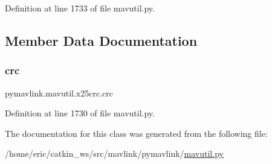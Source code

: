 Definition at line 1733 of file mavutil.\+py.



\subsection{Member Data Documentation}
\mbox{\label{classpymavlink_1_1mavutil_1_1x25crc_a89ee93fb5da26919551f8765f70f476c}} 
\subsubsection{\texorpdfstring{crc}{crc}}
{\footnotesize\ttfamily pymavlink.\+mavutil.\+x25crc.\+crc}



Definition at line 1730 of file mavutil.\+py.



The documentation for this class was generated from the following file\+:\begin{DoxyCompactItemize}
\item 
/home/eric/catkin\+\_\+ws/src/mavlink/pymavlink/\mbox{\hyperlink{mavutil_8py}{mavutil.\+py}}\end{DoxyCompactItemize}
